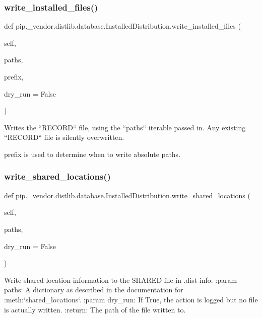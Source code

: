 \subsubsection{\texorpdfstring{write\+\_\+installed\+\_\+files()}{write\_installed\_files()}}
{\footnotesize\ttfamily def pip.\+\_\+vendor.\+distlib.\+database.\+Installed\+Distribution.\+write\+\_\+installed\+\_\+files (\begin{DoxyParamCaption}\item[{}]{self,  }\item[{}]{paths,  }\item[{}]{prefix,  }\item[{}]{dry\+\_\+run = {\ttfamily False} }\end{DoxyParamCaption})}

\begin{DoxyVerb}Writes the ``RECORD`` file, using the ``paths`` iterable passed in. Any
existing ``RECORD`` file is silently overwritten.

prefix is used to determine when to write absolute paths.
\end{DoxyVerb}
 \mbox{\label{classpip_1_1__vendor_1_1distlib_1_1database_1_1InstalledDistribution_af3838a1a36ab26de00c92bfc21c170ab}} 
\subsubsection{\texorpdfstring{write\+\_\+shared\+\_\+locations()}{write\_shared\_locations()}}
{\footnotesize\ttfamily def pip.\+\_\+vendor.\+distlib.\+database.\+Installed\+Distribution.\+write\+\_\+shared\+\_\+locations (\begin{DoxyParamCaption}\item[{}]{self,  }\item[{}]{paths,  }\item[{}]{dry\+\_\+run = {\ttfamily False} }\end{DoxyParamCaption})}

\begin{DoxyVerb}Write shared location information to the SHARED file in .dist-info.
:param paths: A dictionary as described in the documentation for
:meth:`shared_locations`.
:param dry_run: If True, the action is logged but no file is actually
        written.
:return: The path of the file written to.
\end{DoxyVerb}
 

